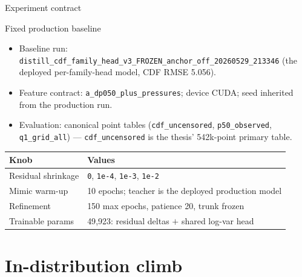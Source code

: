\documentclass[UTF8,aspectratio=169]{ctexbeamer}
\begin{document}
\begin{frame}{Experiment contract}
\small
\begin{block}{Fixed production baseline}
\begin{itemize}\setlength\itemsep{2pt}
  \item Baseline run:
        \texttt{distill\_cdf\_family\_head\_v3\_FROZEN\_anchor\_off\_20260529\_213346}
        (the deployed per-family-head model, CDF RMSE 5.056).
  \item Feature contract: \texttt{a\_dp050\_plus\_pressures}; device CUDA;
        seed inherited from the production run.
  \item Evaluation: canonical point tables
        (\texttt{cdf\_uncensored}, \texttt{p50\_observed}, \texttt{q1\_grid\_all}) ---
        \texttt{cdf\_uncensored} is the thesis' 542k-point primary table.
\end{itemize}
\end{block}

\vspace{0.3em}
\begin{center}
\renewcommand{\arraystretch}{1.15}
\begin{tabular}{@{}L{4.0cm}L{8.6cm}@{}}
\toprule
\textbf{Knob} & \textbf{Values} \\
\midrule
Residual shrinkage & \texttt{0}, \texttt{1e-4}, \texttt{1e-3}, \texttt{1e-2} \\
Mimic warm-up & 10 epochs; teacher is the deployed production model \\
Refinement & 150 max epochs, patience 20, trunk frozen \\
Trainable params & 49{,}923: residual deltas $+$ shared log-var head \\
\bottomrule
\end{tabular}
\end{center}
\end{frame}

\section{In-distribution climb}
\end{document}
